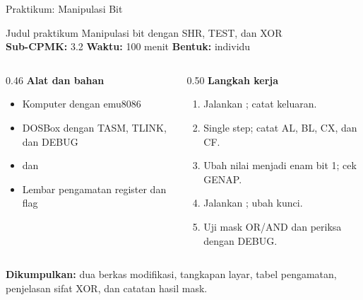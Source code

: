 \documentclass[aspectratio=169,11pt]{beamer}
\begin{document}
\begin{frame}{Praktikum: Manipulasi Bit}
\begin{block}{Judul praktikum}
\small Manipulasi bit dengan SHR, TEST, dan XOR\\[0.15em]
\textbf{Sub-CPMK:} 3.2 \quad\textbullet\quad
\textbf{Waktu:} 100 menit \quad\textbullet\quad
\textbf{Bentuk:} individu
\end{block}

\vspace{0.2em}
\begin{columns}[t]
\begin{column}{0.46\textwidth}
{\color{obeBlue}\bfseries Alat dan bahan}
\begin{itemize}\footnotesize
    \item Komputer dengan emu8086
    \item DOSBox dengan TASM, TLINK, dan DEBUG
    \item {} dan 
    \item Lembar pengamatan register dan flag
\end{itemize}
\end{column}
\begin{column}{0.50\textwidth}
{\color{obeBlue}\bfseries Langkah kerja}
\begin{enumerate}\footnotesize
    \item Jalankan ; catat keluaran.
    \item Single step; catat AL, BL, CX, dan CF.
    \item Ubah nilai menjadi enam bit 1; cek GENAP.
    \item Jalankan ; ubah kunci.
    \item Uji mask OR/AND dan periksa dengan DEBUG.
\end{enumerate}
\end{column}
\end{columns}

\vspace{0.2em}
{\footnotesize\textbf{Dikumpulkan:} dua berkas 
modifikasi, tangkapan layar, tabel pengamatan, penjelasan sifat XOR,
dan catatan hasil mask.\par}
\end{frame}
\end{document}
